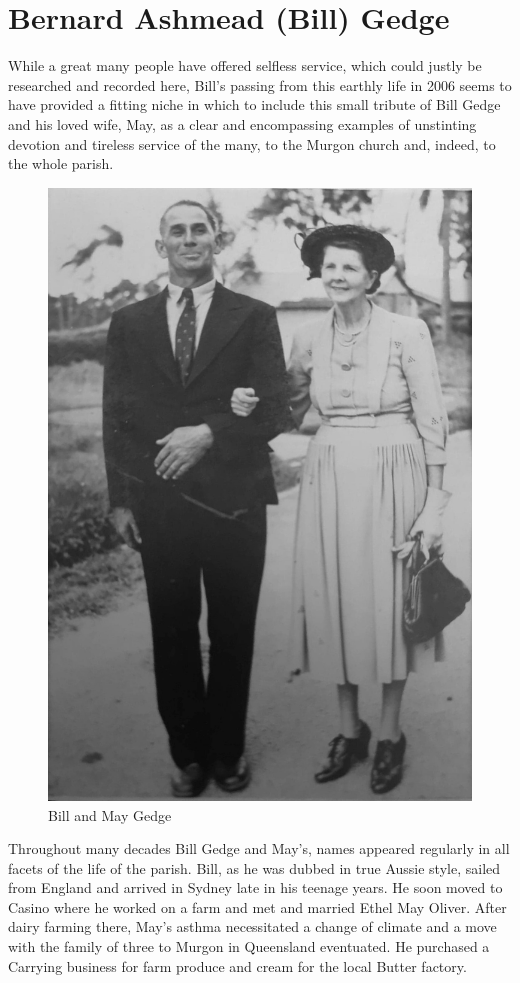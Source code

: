 \section{Bernard Ashmead (Bill) Gedge}



While a great many people have offered selfless service, which could justly be researched and recorded here, Bill's passing from this earthly life in 2006 seems to have provided a fitting niche in which to include this small tribute of Bill Gedge and his loved wife, May, as a clear and encompassing examples of unstinting devotion and tireless service of the many, to the Murgon church and, indeed, to the whole parish.









\begin{figure}
\begin{center}
\includegraphics[width=.7\linewidth,center]{../images/BillAndMayGedge.jpg}
\caption{Bill and May Gedge}
\end{center}
\end{figure}




Throughout many decades Bill Gedge and May's, names appeared regularly in all facets of the life of the parish. Bill, as he was dubbed in true Aussie style, sailed from England and arrived in Sydney late in his teenage years. He soon moved to Casino where he worked on a farm and met and married Ethel May Oliver. After dairy farming there, May's asthma necessitated a change of climate and a move with the family of three to Murgon in Queensland eventuated. He purchased a Carrying business for farm produce and cream for the local Butter factory.



